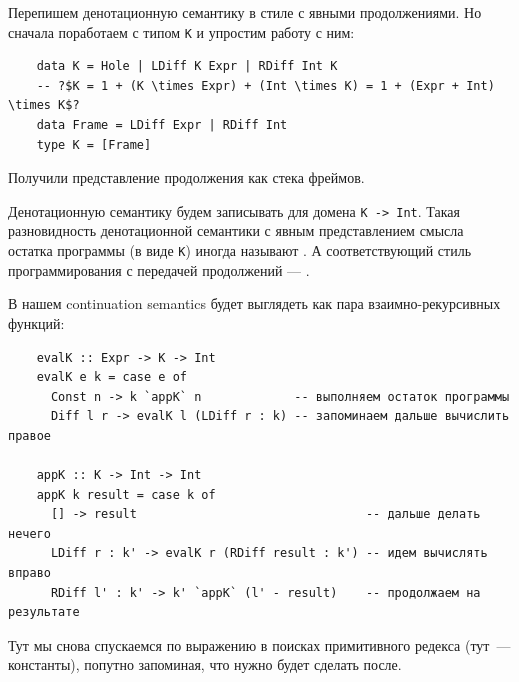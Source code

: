 Перепишем денотационную семантику в стиле с явными продолжениями.
Но сначала поработаем с типом \texttt{K} и упростим работу с ним:
\begin{verbatim}
    data K = Hole | LDiff K Expr | RDiff Int K
    -- ?$K = 1 + (K \times Expr) + (Int \times K) = 1 + (Expr + Int) \times K$?
    data Frame = LDiff Expr | RDiff Int
    type K = [Frame]
\end{verbatim}
Получили представление продолжения как стека фреймов.

Денотационную семантику будем записывать для домена \texttt{K -> Int}.
Такая разновидность денотационной семантики с явным представлением смысла остатка программы (в виде \texttt{K}) иногда называют .
А соответствующий стиль программирования с передачей продолжений --- .

В нашем continuation semantics будет выглядеть как пара взаимно-рекурсивных функций:
\begin{verbatim}
    evalK :: Expr -> K -> Int
    evalK e k = case e of
      Const n -> k `appK` n             -- выполняем остаток программы
      Diff l r -> evalK l (LDiff r : k) -- запоминаем дальше вычислить правое

    appK :: K -> Int -> Int
    appK k result = case k of
      [] -> result                                -- дальше делать нечего
      LDiff r : k' -> evalK r (RDiff result : k') -- идем вычислять вправо
      RDiff l' : k' -> k' `appK` (l' - result)    -- продолжаем на результате
\end{verbatim}
Тут мы снова спускаемся по выражению в поисках примитивного редекса (тут~--- константы), попутно запоминая, что нужно будет сделать после.


